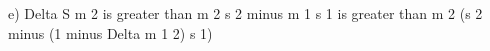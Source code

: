 e) Delta S m 2 is greater than m 2 s 2 minus m 1 s 1 is greater than m 2 (s 2 minus (1 minus Delta m 1 2) s 1)